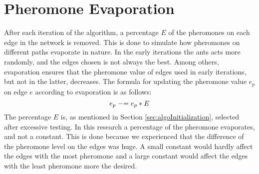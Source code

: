 \section{Pheromone Evaporation}

After each iteration of the algorithm, a percentage $E$ of the pheromones on each edge in the network is removed. This is done to simulate how pheromones on different paths evaporate in nature. In the early iterations the ants acts more randomly, and the edges chosen is not always the best. Among others, evaporation ensures that the pheromone value of edges used in early iterations, but not in the latter, decreases. The formula for updating the pheromone value $e_p$ on edge $e$ according to evaporation is as follows: 
\newline
$$e_p \mathrel{-}= e_p*E$$
\newline
The percentage $E$ is, as mentioned in Section \vref{sec:algoInitialization}, selected after excessive testing. In this research a percentage of the pheromone evaporates, and not a constant. This is done because we experienced that the difference of the pheromone level on the edges was huge. A small constant would hardly affect the edges with the most pheromone and a large constant would affect the edges with the least pheromone more the desired. 
